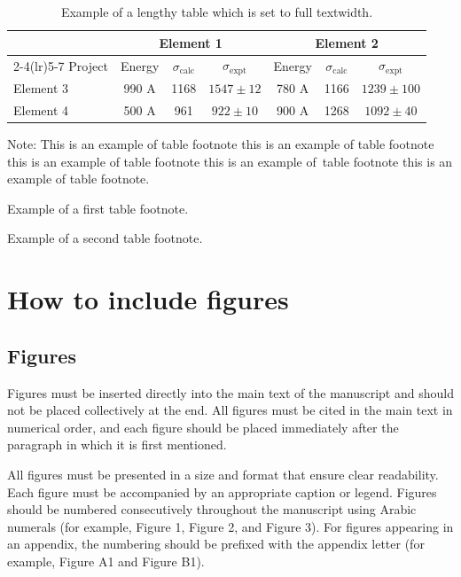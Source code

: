 \documentclass[12pt,a4paper]{article}
\begin{document}
\begin{table}[!ht]
\caption{Example of a lengthy table which is set to full textwidth.\label{tab2}}
\tabcolsep=0pt
\begin{threeparttable}
\begin{tabular*}{\textwidth}{@{\extracolsep{\fill}}lcccccc@{\extracolsep{\fill}}}
\toprule
& \multicolumn{3}{c}{Element 1\tnote{1}} & \multicolumn{3}{c}{Element 2\tnote{2}} \\
\cmidrule(lr){2-4}\cmidrule(lr){5-7}
Project & Energy & $\sigma_{\mathrm{calc}}$ & $\sigma_{\mathrm{expt}}$ & Energy & $\sigma_{\mathrm{calc}}$ & $\sigma_{\mathrm{expt}}$ \\
\midrule
Element 3 & 990 A & 1168 & $1547\pm12$ & 780 A & 1166 & $1239\pm100$ \\
Element 4 & 500 A & 961 & $922\pm10$ & 900 A & 1268 & $1092\pm40$ \\
\bottomrule
\end{tabular*}
\begin{tablenotes}
\item Note: This is an example of table footnote this is an example of table footnote this is an example of table footnote this is an example of~table footnote this is an example of table footnote.
\item[1] Example of a first table footnote.
\item[2] Example of a second table footnote.
\end{tablenotes}
\end{threeparttable}
\end{table}


\section{How to include figures}\label{sec6}

\subsection{Figures}

Figures must be inserted directly into the main text of the manuscript and should not be placed collectively at the end. All figures must be cited in the main text in numerical order, and each figure should be placed immediately after the paragraph in which it is first mentioned.

All figures must be presented in a size and format that ensure clear readability. Each figure must be accompanied by an appropriate caption or legend. Figures should be numbered consecutively throughout the manuscript using Arabic numerals (for example, Figure 1, Figure 2, and Figure 3). For figures appearing in an appendix, the numbering should be prefixed with the appendix letter (for example, Figure A1 and Figure B1).
\end{document}
